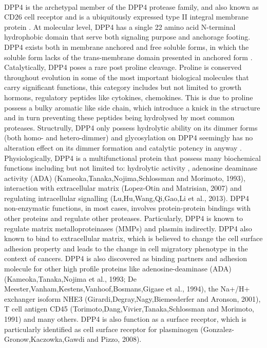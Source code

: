 \\
DPP4 is the archetypal member of the DPP4 protease family, and also known as CD26 cell receptor \cite{Abbott:2000qr} and is a ubiquitously expressed type II integral membrane protein \cite{Mentlein_1999}. At molecular level, DPP4 has a single 22 amino acid N-terminal hydrophobic domain that serve both signaling purpose and anchorage footing. \cite{Mentlein_1999, Abbott_2002} DPP4 exists both in membrane anchored and free soluble forms, in which the soluble form lacks of the trans-membrane domain presented in anchored form \cite{Lambeir:2001ab,Abbott:2000qr}. Catalytically, DPP4 poses a rare post proline cleavage. Proline is conserved throughout evolution in some of the most important biological molecules that carry significant functions, this category includes but not limited to growth hormons, regulatory peptides like cytokines, chemokines. This is due to proline possess a bulky aromatic like side chain, which introduce a knick in the structure and in turn preventing these peptides being hydrolysed by most common proteases. Structrully, DPP4 only possess hydrolytic ability on its dimmer forms (both homo- and hetero-dimmer) and glycosylation on DPP4 seemingly has no alteration effect on its dimmer formation and catalytic potency in anyway \cite{Aertgeerts:2004aa}. 
\\
Physiologically, DPP4 is a multifunctional protein that possess many biochemical functions including but not limited to: hydrolytic activity \cite{Lambeir:2003qf}, adenosine deaminase activity (ADA) (Kameoka,Tanaka,Nojima,Schlossman and Morimoto, 1993), interaction with extracellular matrix (Lopez-Otin and Matrisian, 2007) and regulating intracellular signalling (Lu,Hu,Wang,Qi,Gao,Li et al., 2013). DPP4 non-enzymatic functions, in most cases, involves protein-protein bindings with other proteins and regulate other proteases. Particularly, DPP4 is known to regulate matrix metalloproteinases (MMPs) and plasmin indirectly.  DPP4 also known to bind to extracellular matrix, which is believed to change the cell surface adhesion property and leads to the change in cell migratory phenotype in the context of cancers. DPP4 is also discovered as binding partners and adhesion molecule for other high profile proteins like adenosine-deaminase (ADA) (Kameoka,Tanaka,Nojima et al., 1993; De Meester,Vanham,Kestens,Vanhoof,Bosmans,Gigase et al., 1994), the Na+/H+ exchanger isoform NHE3 (Girardi,Degray,Nagy,Biemesderfer and Aronson, 2001), T cell antigen CD45 (Torimoto,Dang,Vivier,Tanaka,Schlossman and Morimoto, 1991) and many others. DPP4 is also function as a surface receptor, which is particularly identified as cell surface receptor for plasminogen (Gonzalez-Gronow,Kaczowka,Gawdi and Pizzo, 2008).  

